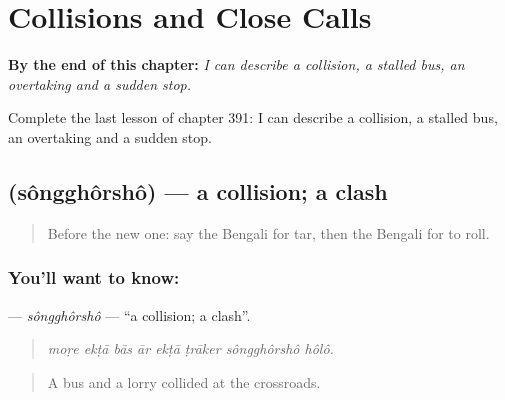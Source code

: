 
\chapter{Collisions and Close Calls}
\label{ch:bn-collisions-and-close-calls}

\begin{chapteropening}
\textbf{By the end of this chapter:} \emph{I can describe a collision, a stalled bus, an overtaking and a sudden stop.}

Complete the last lesson of chapter 391: I can describe a collision, a stalled bus, an overtaking and a sudden stop.
\end{chapteropening}

\section[\texorpdfstring{\bn{সংঘর্ষ} (sôngghôrshô)}{সংঘর্ষ (sôngghôrshô)}]{ (sôngghôrshô) — a collision; a clash}

\label{lesson:BN-C391-songghorsho}



\begin{quote}
Before the new one: say the Bengali for tar, then the Bengali for to roll.
\end{quote}

\subsection*{You'll want to know: }
\textbf{} — \emph{sôngghôrshô} — \textquotedblleft{}a collision; a clash\textquotedblright{}.

\begin{quote}
       
\end{quote}

\begin{quote}
\emph{moṛe ekṭā bās ār ekṭā ṭrāker sôngghôrshô hôlô.}
\end{quote}

\begin{quote}
A bus and a lorry collided at the crossroads.
\end{quote}

